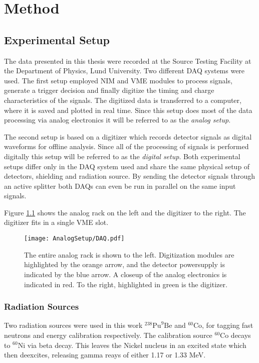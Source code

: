 \documentclass[main.tex]{subfiles}
\begin{document}
\chapter{Method}
\section{Experimental Setup}
The data presented in this thesis were recorded at the Source Testing Facility at the Department of Physics, Lund University. Two different DAQ systems were used. The first setup employed NIM and VME modules to process signals, generate a trigger decision and finally digitize the timing and charge characteristics of the signals. The digitized data is transferred to a computer, where it is saved and plotted in real time. Since this setup does most of the data processing via analog electronics it will be referred to as the \textit{analog setup}. 

The second setup is based on a digitizer which records detector signals as digital waveforms for offline analysis. Since all of the processing of signals is performed digitally this setup will be referred to as the \textit{digital setup}. 
Both experimental setups differ only in the DAQ system used and share the same physical setup of detectors, shielding and radiation source. By sending the detector signals through an active splitter both DAQs can even be run in parallel on the same input signals.

Figure \ref{fig:DAQ} shows the analog rack on the left and the digitizer to the right. The digitizer fits in a single VME slot.

\begin{figure}[h]
    \centering
        \texttt{[image: AnalogSetup/DAQ.pdf]}
        \caption[Photograps of the analog DAQ setup and the digitizer.]{The entire analog rack is shown to the left. Digitization modules are highlighted by the orange arrow, and the detector powersupply is indicated by the blue arrow. A closeup of the analog electronics is indicated in red. To the right, highlighted in green is the digitizer.}
    \label{fig:DAQ}
\end{figure}

\subsection{Radiation Sources}
Two radiation sources were used in this work $^\text{238}\text{Pu}^\text{9}\text{Be}$ and $^\text{60}\text{Co}$, for tagging fast neutrons and energy calibration respectively. The calibration source $^\text{60}\text{Co}$ decays to $^\text{60}\text{Ni}$ via beta decay. This leaves the Nickel nucleus in an excited state which then deexcites, releasing gamma reays of either 1.17 or 1.33 MeV\cite{Nudat}.
\end{document}
